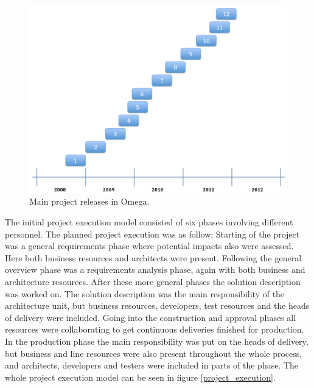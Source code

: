 \begin{figure}
\centering
\includegraphics[trim = 0mm 0mm 0mm 0mm,width=\textwidth]{images/project_releases}
\caption{Main project releases in Omega.}
\label{releases}
\end{figure}

The initial project execution model consisted of six phases involving different personnel. The planned project execution was as follow: Starting of the project was a general requirements phase where potential impacts also were assessed. Here both business resources and architects were present. Following the general overview phase was a requirements analysis phase, again with both business and architecture resources. After these more general phases the solution description was worked on. The solution description was the main responsibility of the architecture unit, but business resources, developers, test resources and the heads of delivery were included. Going into the construction and approval phases all resources were collaborating to get continuous deliveries finished for production. In the production phase the main responsibility was put on the heads of delivery, but business and line resources were also present throughout the whole process, and architects, developers and testers were included in parts of the phase. The whole project execution model can be seen in figure \ref{project_execution}.

